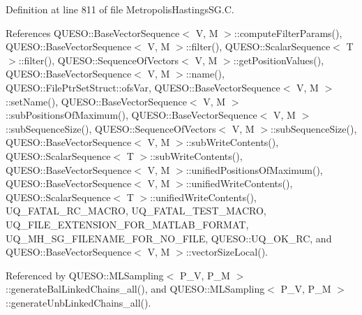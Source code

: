 Definition at line 811 of file Metropolis\-Hastings\-S\-G.\-C.



References Q\-U\-E\-S\-O\-::\-Base\-Vector\-Sequence$<$ V, M $>$\-::compute\-Filter\-Params(), Q\-U\-E\-S\-O\-::\-Base\-Vector\-Sequence$<$ V, M $>$\-::filter(), Q\-U\-E\-S\-O\-::\-Scalar\-Sequence$<$ T $>$\-::filter(), Q\-U\-E\-S\-O\-::\-Sequence\-Of\-Vectors$<$ V, M $>$\-::get\-Position\-Values(), Q\-U\-E\-S\-O\-::\-Base\-Vector\-Sequence$<$ V, M $>$\-::name(), Q\-U\-E\-S\-O\-::\-File\-Ptr\-Set\-Struct\-::ofs\-Var, Q\-U\-E\-S\-O\-::\-Base\-Vector\-Sequence$<$ V, M $>$\-::set\-Name(), Q\-U\-E\-S\-O\-::\-Base\-Vector\-Sequence$<$ V, M $>$\-::sub\-Positions\-Of\-Maximum(), Q\-U\-E\-S\-O\-::\-Base\-Vector\-Sequence$<$ V, M $>$\-::sub\-Sequence\-Size(), Q\-U\-E\-S\-O\-::\-Sequence\-Of\-Vectors$<$ V, M $>$\-::sub\-Sequence\-Size(), Q\-U\-E\-S\-O\-::\-Base\-Vector\-Sequence$<$ V, M $>$\-::sub\-Write\-Contents(), Q\-U\-E\-S\-O\-::\-Scalar\-Sequence$<$ T $>$\-::sub\-Write\-Contents(), Q\-U\-E\-S\-O\-::\-Base\-Vector\-Sequence$<$ V, M $>$\-::unified\-Positions\-Of\-Maximum(), Q\-U\-E\-S\-O\-::\-Base\-Vector\-Sequence$<$ V, M $>$\-::unified\-Write\-Contents(), Q\-U\-E\-S\-O\-::\-Scalar\-Sequence$<$ T $>$\-::unified\-Write\-Contents(), U\-Q\-\_\-\-F\-A\-T\-A\-L\-\_\-\-R\-C\-\_\-\-M\-A\-C\-R\-O, U\-Q\-\_\-\-F\-A\-T\-A\-L\-\_\-\-T\-E\-S\-T\-\_\-\-M\-A\-C\-R\-O, U\-Q\-\_\-\-F\-I\-L\-E\-\_\-\-E\-X\-T\-E\-N\-S\-I\-O\-N\-\_\-\-F\-O\-R\-\_\-\-M\-A\-T\-L\-A\-B\-\_\-\-F\-O\-R\-M\-A\-T, U\-Q\-\_\-\-M\-H\-\_\-\-S\-G\-\_\-\-F\-I\-L\-E\-N\-A\-M\-E\-\_\-\-F\-O\-R\-\_\-\-N\-O\-\_\-\-F\-I\-L\-E, Q\-U\-E\-S\-O\-::\-U\-Q\-\_\-\-O\-K\-\_\-\-R\-C, and Q\-U\-E\-S\-O\-::\-Base\-Vector\-Sequence$<$ V, M $>$\-::vector\-Size\-Local().



Referenced by Q\-U\-E\-S\-O\-::\-M\-L\-Sampling$<$ P\-\_\-\-V, P\-\_\-\-M $>$\-::generate\-Bal\-Linked\-Chains\-\_\-all(), and Q\-U\-E\-S\-O\-::\-M\-L\-Sampling$<$ P\-\_\-\-V, P\-\_\-\-M $>$\-::generate\-Unb\-Linked\-Chains\-\_\-all().


